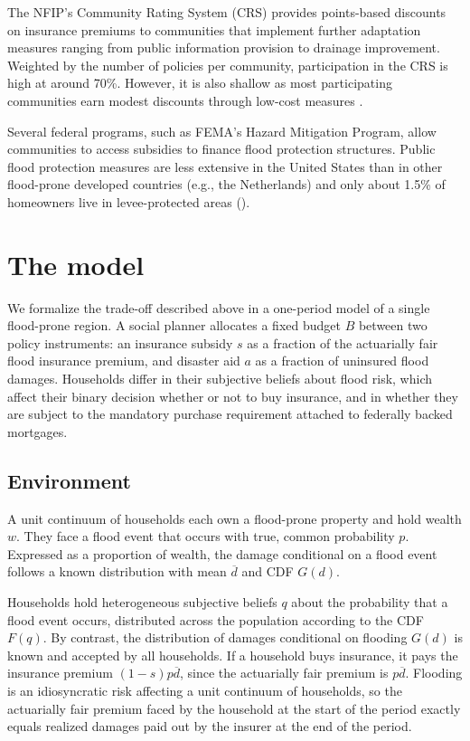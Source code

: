 \documentclass[12pt]{article}
\begin{document}
The NFIP's Community Rating System (CRS) provides points-based discounts on insurance premiums to communities that implement further adaptation measures ranging from public information provision to drainage improvement. Weighted by the number of policies per community, participation in the CRS is high at around 70\%. However, it is also shallow as most participating communities earn modest discounts through low-cost measures \citep{fema2021crs}.

Several federal programs, such as FEMA's Hazard Mitigation Program, allow communities to access subsidies to finance flood protection structures. Public flood protection measures are less extensive in the United States than in other flood-prone developed countries (e.g., the Netherlands) and only about 1.5\% of homeowners live in levee-protected areas (\citealp{qin2026flood}).

\section{The model}
\label{sec:model}

We formalize the trade-off described above in a one-period model of a single flood-prone region. A social planner allocates a fixed budget $B$ between two policy instruments: an insurance subsidy $s$ as a fraction of the actuarially fair flood insurance premium, and disaster aid $a$ as a fraction of uninsured flood damages. Households differ in their subjective beliefs about flood risk, which affect their binary decision whether or not to buy insurance, and in whether they are subject to the mandatory purchase requirement attached to federally backed mortgages.

\subsection{Environment}

A unit continuum of households each own a flood-prone property and hold wealth $w$. They face a flood event that occurs with true, common probability $p$. Expressed as a proportion of wealth, the damage conditional on a flood event  follows a known distribution with mean $\overline{d}$ and CDF $G(d)$.

Households hold heterogeneous subjective beliefs $q$ about the probability that a flood event occurs, distributed across the population according to the CDF $F(q)$. By contrast, the distribution of damages conditional on flooding $G(d)$ is known and accepted by all households. If a household buys insurance, it pays the insurance premium $(1-s)p\overline{d}$, since the actuarially fair premium is $p\overline{d}$. Flooding is an idiosyncratic risk affecting a unit continuum of households, so the actuarially fair premium faced by the household at the start of the period exactly equals realized damages paid out by the insurer at the end of the period.
\end{document}
